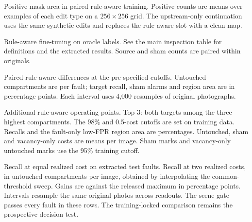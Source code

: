 \begin{table}[t]
\centering
\caption{Positive mask area in paired rule-aware training. Positive counts are means over examples of each edit type on a $256{\times}256$ grid. The upstream-only continuation uses the same synthetic edits and replaces the rule-aware slot with a clean map.}
\label{tab:area_v3}
\small

\end{table}

\begin{table}[t]
\centering
\caption{Rule-aware fine-tuning on oracle labels. See the main inspection table for definitions and the extracted results. Source and sham counts are paired within originals.}
\label{tab:oracle_v3}
\small
\setlength{\tabcolsep}{4.5pt}

\end{table}

\begin{table}[t]
\centering
\caption{Paired rule-aware differences at the pre-specified cutoffs. Untouched compartments are per fault; target recall, sham alarms and region area are in percentage points. Each interval uses 4,000 resamples of original photographs.}
\label{tab:contrasts_v3}
\small

\end{table}

\begin{table}[t]
\centering
\caption{Additional rule-aware operating points. Top 3: both targets among the three highest compartments. The 98\% and 0.5-cost cutoffs are set on training data. Recalls and the fault-only low-FPR region area are percentages. Untouched, sham and vacancy-only costs are means per image. Sham marks and vacancy-only untouched marks use the 95\% training cutoff.}
\label{tab:operating_v3}
\scriptsize
\setlength{\tabcolsep}{3pt}

\end{table}

\begin{table}[t]
\centering
\caption{Recall at equal realized cost on extracted test faults. Recall at two realized costs, in untouched compartments per image, obtained by interpolating the common-threshold sweep. Gains are against the released maximum in percentage points. Intervals resample the same original photos across readouts. The scene gate passes every fault in these rows. The training-locked comparison remains the prospective decision test.}
\label{tab:exactcost}
\scriptsize
\setlength{\tabcolsep}{4pt}

\end{table}
